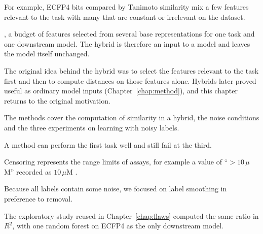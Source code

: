 
For example, ECFP4 bits compared by Tanimoto similarity mix a few features relevant to the task with many that are constant or irrelevant on the dataset.

, a budget of features selected from several base representations for one task and one downstream model. The hybrid is therefore an input to a model and leaves the model itself unchanged.

The original idea behind the hybrid was to select the features relevant to the task first and then to compute distances on those features alone. Hybrids later proved useful as ordinary model inputs (Chapter~\ref{chap:method}), and this chapter returns to the original motivation.

The methods cover the computation of similarity in a hybrid, the noise conditions and the three experiments on learning with noisy labels.

A method can perform the first task well and still fail at the third.

Censoring represents the range limits of assays, for example a value of ``$>10\,\mu$M'' recorded as $10\,\mu$M \citep{Svensson2025}.

Because all labels contain some noise, we focused on label smoothing in preference to removal.

The exploratory study reused in Chapter~\ref{chap:flaws} computed the same ratio in $R^2$, with one random forest on ECFP4 as the only downstream model.

